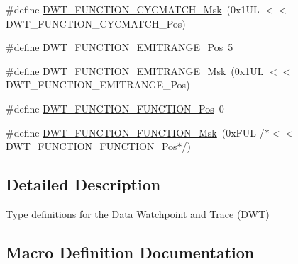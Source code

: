 \begin{DoxyCompactItemize}
\item 
\#define \hyperlink{group___c_m_s_i_s___d_w_t_ga8e2ed09bdd33a8f7f7ce0444f5f3bb25}{D\+W\+T\+\_\+\+F\+U\+N\+C\+T\+I\+O\+N\+\_\+\+C\+Y\+C\+M\+A\+T\+C\+H\+\_\+\+Msk}~(0x1\+U\+L $<$$<$ D\+W\+T\+\_\+\+F\+U\+N\+C\+T\+I\+O\+N\+\_\+\+C\+Y\+C\+M\+A\+T\+C\+H\+\_\+\+Pos)
\item 
\#define \hyperlink{group___c_m_s_i_s___d_w_t_ga41d5b332216baa8d29561260a1b85659}{D\+W\+T\+\_\+\+F\+U\+N\+C\+T\+I\+O\+N\+\_\+\+E\+M\+I\+T\+R\+A\+N\+G\+E\+\_\+\+Pos}~5
\item 
\#define \hyperlink{group___c_m_s_i_s___d_w_t_gad46dd5aba29f2e28d4d3f50b1d291f41}{D\+W\+T\+\_\+\+F\+U\+N\+C\+T\+I\+O\+N\+\_\+\+E\+M\+I\+T\+R\+A\+N\+G\+E\+\_\+\+Msk}~(0x1\+U\+L $<$$<$ D\+W\+T\+\_\+\+F\+U\+N\+C\+T\+I\+O\+N\+\_\+\+E\+M\+I\+T\+R\+A\+N\+G\+E\+\_\+\+Pos)
\item 
\#define \hyperlink{group___c_m_s_i_s___d_w_t_ga5797b556edde2bbaa4d33dcdb1a891bb}{D\+W\+T\+\_\+\+F\+U\+N\+C\+T\+I\+O\+N\+\_\+\+F\+U\+N\+C\+T\+I\+O\+N\+\_\+\+Pos}~0
\item 
\#define \hyperlink{group___c_m_s_i_s___d_w_t_ga3b2cda708755ecf5f921d08b25d774d1}{D\+W\+T\+\_\+\+F\+U\+N\+C\+T\+I\+O\+N\+\_\+\+F\+U\+N\+C\+T\+I\+O\+N\+\_\+\+Msk}~(0x\+F\+U\+L /$\ast$$<$$<$ D\+W\+T\+\_\+\+F\+U\+N\+C\+T\+I\+O\+N\+\_\+\+F\+U\+N\+C\+T\+I\+O\+N\+\_\+\+Pos$\ast$/)
\end{DoxyCompactItemize}


\subsection{Detailed Description}
Type definitions for the Data Watchpoint and Trace (D\+WT) 



\subsection{Macro Definition Documentation}
